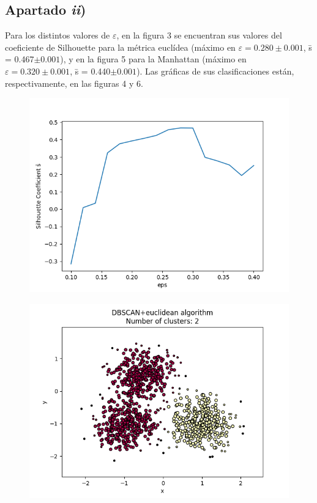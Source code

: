 \documentclass[a4paper]{article}
\begin{document}
	\subsection{Apartado \textit{ii})}
	Para los distintos valores de $\varepsilon$, en la figura 3 se encuentran sus valores del coeficiente de Silhouette para la métrica euclídea (máximo en $\varepsilon=0.280\pm 0.001$, \={s} = 0.467$\pm 0.001$), y en la figura 5 para la Manhattan (máximo en $\varepsilon=0.320\pm 0.001$, \={s} = 0.440$\pm 0.001$). Las gráficas de sus clasificaciones están, respectivamente, en las figuras 4 y 6. 
	
	\begin{figure}[h!]\centering
\begin{minipage}{.4\textwidth}\label{fig:3}
	\includegraphics[width=\linewidth]{Figure_3}
	\end{minipage}\qquad
\begin{minipage}{.4\textwidth}\label{fig:4}
	\includegraphics[width=\linewidth]{Figure_4}
	\end{minipage}
	\end{figure}
	
\end{document}
